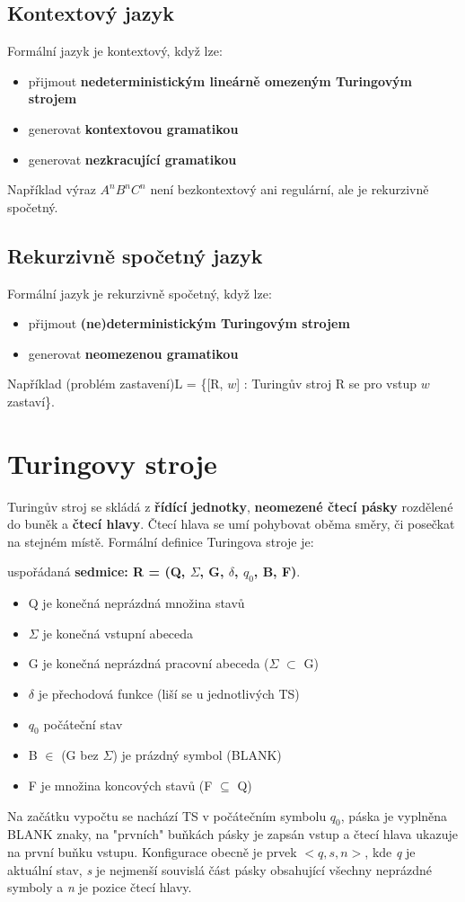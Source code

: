 \documentclass{szzclass}
\begin{document}
\subsection{Kontextový jazyk}
Formální jazyk je kontextový, když lze:
\begin{itemize}
\item přijmout \textbf{nedeterministickým lineárně omezeným Turingovým strojem}
\item generovat \textbf{kontextovou gramatikou}
\item generovat \textbf{nezkracující gramatikou}
\end{itemize}
Například výraz $A^nB^nC^n$ není bezkontextový ani regulární, ale je rekurzivně spočetný.

\subsection{Rekurzivně spočetný jazyk}
Formální jazyk je rekurzivně spočetný, když lze:
\begin{itemize}
\item přijmout \textbf{(ne)deterministickým Turingovým strojem}
\item generovat \textbf{neomezenou gramatikou}
\end{itemize}
Například (problém zastavení)L = \{[R, $w$] : Turingův stroj R se pro vstup $w$ zastaví\}.

\section{Turingovy stroje}
Turingův stroj se skládá z \textbf{řídící jednotky}, \textbf{neomezené čtecí pásky} rozdělené do buněk a \textbf{čtecí hlavy}.
Čtecí hlava se umí pohybovat oběma směry, či posečkat na stejném místě.
\newline
Formální definice Turingova stroje je:

uspořádaná \textbf{sedmice: R = (Q, $\Sigma$, G, $\delta$, $q_0$, B, F)}.
\begin{itemize}
\item Q je konečná neprázdná množina stavů
\item $\Sigma$ je konečná vstupní abeceda
\item G je konečná neprázdná pracovní abeceda ($\Sigma$ $\subset$ G)
\item $\delta$ je přechodová funkce (liší se u jednotlivých TS)
\item $q_0$ počáteční stav
\item B $\in$ (G bez $\Sigma$) je prázdný symbol (BLANK)
\item F je množina koncových stavů (F $\subseteq$ Q)
\end{itemize}
Na začátku vypočtu se nachází TS v počátečním symbolu $q_0$, páska je vyplněna BLANK znaky, na "prvních" buňkách pásky je zapsán vstup a čtecí hlava ukazuje na první buňku vstupu.
\newline
Konfigurace obecně je prvek $<q,s,n>$, kde \textit{q} je aktuální stav, \textit{s} je nejmenší souvislá část pásky obsahující všechny neprázdné symboly a \textit{n} je pozice čtecí hlavy.
\end{document}
